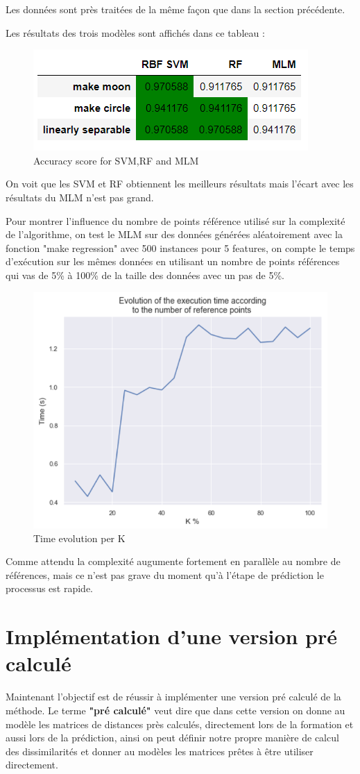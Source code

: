 \documentclass[12pt,a4paper]{report}
\begin{document}
Les données sont près traitées de la même façon que dans la section précédente. 
\par Les résultats des trois modèles sont affichés dans ce tableau :\\
\begin{figure}[!h]
    \centering
\includegraphics[height=0.2\textwidth]{three_c.png}
\caption{Accuracy score for SVM,RF and MLM}
\end{figure}
\par On voit que les SVM et RF obtiennent les meilleurs résultats mais l'écart avec les résultats du MLM n'est pas grand.

\par Pour montrer l'influence du nombre de points référence utilisé sur la complexité de l'algorithme, on test le MLM sur des données générées aléatoirement avec la fonction "make regression" avec 500 instances pour 5 features, on compte le temps d'exécution sur les mêmes données en utilisant un nombre de points références qui vas de 5\% à 100\% de la taille des données avec un pas de 5\%.

\begin{figure}[!h]
\vspace{-0.5cm}
    \centering
\includegraphics[height=0.45\textwidth]{timeEvol.png}
\caption{Time evolution per K}
\end{figure}
Comme attendu la complexité augumente fortement en parallèle au nombre de références, mais ce n'est pas grave du moment qu'à l'étape de prédiction le processus est rapide.

{\color{MidnightBlue}\chapter{Implémentation d'une version pré calculé}}
\par Maintenant l'objectif est de réussir à implémenter une version pré calculé de la méthode. Le terme \textbf{"pré calculé"} veut dire que dans cette version on donne au modèle les matrices de distances près calculés, directement lors de la formation et aussi lors de la prédiction, ainsi on peut définir notre propre manière de calcul des dissimilarités et donner au modèles les matrices prêtes à être utiliser directement.
\end{document}
